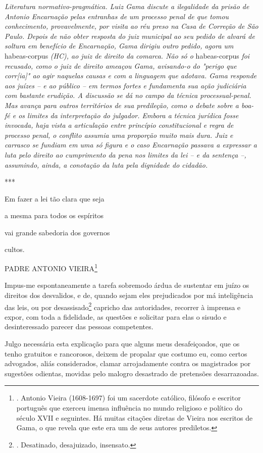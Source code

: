 \emph{Literatura normativo-pragmática. Luiz Gama discute a ilegalidade
da prisão de Antonio Encarnação pelas entranhas de um processo penal de
que tomou conhecimento, provavelmente, por visita ao réu preso na Casa
de Correção de São Paulo. Depois de não obter resposta do juiz municipal
ao seu pedido de alvará de soltura em benefício de Encarnação, Gama
dirigiu outro pedido, agora um} habeas-corpus \emph{(HC), ao juiz de
direito da comarca. Não só o} habeas-corpus \emph{foi recusado, como o
juiz de direito ameaçou Gama, avisando-o do "perigo que corr{[}ia{]}" ao
agir naquelas causas e com a linguagem que adotava. Gama responde aos
juízes -- e ao público -- em termos fortes e fundamenta sua ação
judiciária com bastante erudição. A discussão se dá no campo da técnica
processual-penal. Mas avança para outros territórios de sua predileção,
como o debate sobre a boa-fé e os limites da interpretação do julgador.
Embora a técnica jurídica fosse invocada, haja vista a articulação entre
princípio constitucional e regra de processo penal, o conflito assumia
uma proporção muito mais dura. Juiz e carrasco se fundiam em uma só
figura e o caso Encarnação passava a expressar a luta pelo direito ao
cumprimento da pena nos limites da lei -- e da sentença --, assumindo,
ainda, a conotação da luta pela dignidade do cidadão.}

***

Em fazer a lei tão clara que seja

a mesma para todos os espíritos

vai grande sabedoria dos governos

cultos.

PADRE ANTONIO VIEIRA\footnote{. Antonio Vieira (1608-1697) foi um
  sacerdote católico, filósofo e escritor português que exerceu imensa
  influência no mundo religioso e político do século XVII e seguintes.
  Há muitas citações diretas de Vieira nos escritos de Gama, o que
  revela que este era um de seus autores prediletos.}

Impus-me espontaneamente a tarefa sobremodo árdua de sustentar em juízo
os direitos dos desvalidos, e de, quando sejam eles prejudicados por má
inteligência das leis, ou por desassisado\footnote{. Desatinado,
  desajuizado, insensato.} capricho das autoridades, recorrer à imprensa
e expor, com toda a fidelidade, as questões e solicitar para elas o
sisudo e desinteressado parecer das pessoas competentes.

Julgo necessária esta explicação para que alguns meus desafeiçoados, que
os tenho gratuitos e rancorosos, deixem de propalar que costumo eu, como
certos advogados, aliás considerados, clamar arrojadamente contra os
magistrados por sugestões odientas, movidas pelo malogro desastrado de
pretensões desarrazoadas.

